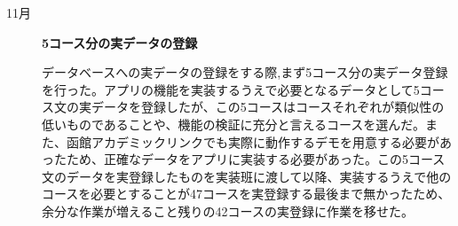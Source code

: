 ﻿\begin{description}
 \item[11月] \textbf{5コース分の実データの登録}\par
データベースへの実データの登録をする際,まず5コース分の実データ登録を行った。アプリの機能を実装するうえで必要となるデータとして5コース文の実データを登録したが、この5コースはコースそれぞれが類似性の低いものであることや、機能の検証に充分と言えるコースを選んだ。また、函館アカデミックリンクでも実際に動作するデモを用意する必要があったため、正確なデータをアプリに実装する必要があった。この5コース文のデータを実登録したものを実装班に渡して以降、実装するうえで他のコースを必要とすることが47コースを実登録する最後まで無かったため、余分な作業が増えること残りの42コースの実登録に作業を移せた。
 \par

\end{description}
